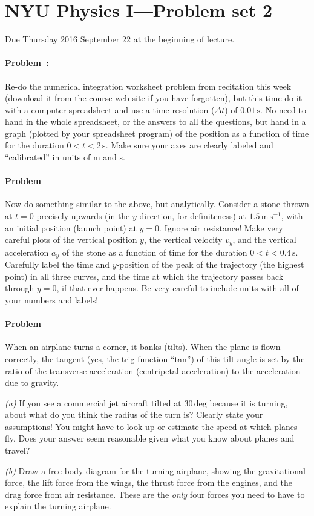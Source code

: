 \documentclass[12pt]{article}
\newcommand{\s}{\mathrm{s}}
\renewcommand{\deg}{\mathrm{deg}}
\newcommand{\mps}{\mathrm{m}\,\mathrm{s}^{-1}}
\newcounter{problem}
\begin{document}
\sloppy\sloppypar\raggedbottom\frenchspacing\thispagestyle{empty}

\section*{NYU Physics I---Problem set 2}

Due Thursday 2016 September 22 at the beginning of lecture.

\paragraph{Problem~\theproblem:}%
Re-do the numerical integration worksheet problem from recitation this
week (download it from the course web site if you have forgotten), but
this time do it with a computer spreadsheet and use a time resolution
($\Delta t$) of $0.01\,\s$.  No need to hand in the whole spreadsheet,
or the answers to all the questions, but hand in a graph (plotted by
your spreadsheet program) of the position as a function of time for
the duration $0<t<2\,\s$.  Make sure your axes are clearly labeled and
``calibrated'' in units of m and s.

\paragraph{Problem~\theproblem}%
Now do something similar to the above, but analytically.  Consider a
stone thrown at $t=0$ precisely upwards (in the $y$ direction, for
definiteness) at $1.5\,\mps$, with an initial position (launch point)
at $y=0$.  Ignore air resistance!  Make very careful plots of the
vertical position $y$, the vertical velocity $v_y$, and the vertical
acceleration $a_y$ of the stone as a function of time for the duration
$0<t<0.4\,\s$.  Carefully label the time and $y$-position of
the peak of the trajectory (the highest point) in all three curves,
and the time at which the trajectory passes back through $y=0$, if
that ever happens. Be very careful to include units with all of your
numbers and labels!

\paragraph{Problem~\theproblem}%
When an airplane turns a corner, it banks (tilts). When the plane is
flown correctly, the tangent (yes, the trig function ``tan'') of this
tilt angle is set by the ratio of the transverse acceleration
(centripetal acceleration) to the acceleration due to gravity.

\textsl{(a)} If you see a commercial jet aircraft tilted at $30\,\deg$
because it is turning, about what do you think the radius of the turn
is? Clearly state your assumptions! You might have to look up or
estimate the speed at which planes fly. Does your answer seem
reasonable given what you know about planes and travel?

\textsl{(b)} Draw a free-body diagram for the turning airplane,
showing the gravitational force, the lift force from the wings, the
thrust force from the engines, and the drag force from air resistance.
These are the \emph{only} four forces you need to have to explain
the turning airplane.
\end{document}
